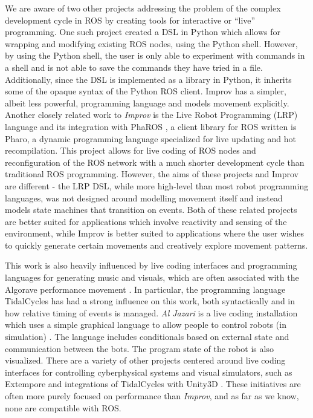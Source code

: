\documentclass[sigconf]{acmart}
\begin{document}
We are aware of two other projects addressing the problem of the complex
development cycle in ROS by creating tools for interactive or ``live''
programming. One such project \cite{python_live_DSLRob} created a DSL in Python
which allows for wrapping and modifying existing ROS nodes, using the Python
shell. However, by using the Python shell, the user is only able to experiment
with commands in a shell and is not able to save the commands they have tried in
a file. Additionally, since the DSL is implemented as a library in Python, it
inherits some of the opaque syntax of the Python ROS client. Improv has a
simpler, albeit less powerful, programming language and models movement
explicitly. Another closely related work to \emph{Improv} is the Live Robot
Programming (LRP) language \cite{campusano2017live} and its integration with PhaROS
\cite{estefo2014towards}, a client library for ROS written is Pharo, a dynamic
programming language specialized for live updating and hot recompilation. This
project allows for live coding of ROS nodes and reconfiguration of the ROS
network with a much shorter development cycle than traditional ROS programming.
However, the aims of these projects and Improv are different - the LRP DSL,
while more high-level than most robot programming languages, was not designed
around modelling movement itself and instead models state machines that
transition on events. Both of these related projects are better suited for
applications which involve reactivity and sensing of the environment, while
Improv is better suited to applications where the user wishes to quickly
generate certain movements and creatively explore movement patterns.

This work is also heavily influenced by live coding interfaces and programming
languages for generating music and visuals, which are often associated with the
Algorave performance movement \cite{collins2014algorave}. In particular, the
programming language TidalCycles \cite{mclean2010tidal} has had a strong
influence on this work, both syntactically and in how relative timing of events
is managed. \emph{Al Jazari} is a live coding installation which uses a simple
graphical language to allow people to control robots (in simulation)
\cite{mclean2010visualisation}. The language includes conditionals based on
external state and communication between the bots. The program state of the
robot is also visualized. There are a variety of other projects centered around
live coding interfaces for controlling cyberphysical systems and visual
simulators, such as Extempore and integrations of TidalCycles with Unity3D
\cite{livecoding14}. These initiatives are often more purely focused on
performance than \emph{Improv}, and as far as we know, none are compatible with
ROS.
\end{document}

